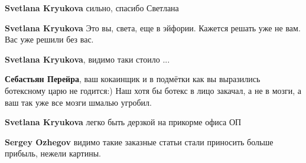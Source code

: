 \begin{itemize}
\begin{itemize}
 
\textbf{Svetlana Kryukova} сильно, спасибо Светлана

 
\textbf{Svetlana Kryukova} Это вы, света, еще
в эйфории. Кажется решать уже не вам. Вас уже решили без вас.

 
\textbf{Svetlana Kryukova}, видимо таки стоило ...

 
\textbf{Себастьян Перейра}, ваш кокаинщик и в подмётки как вы выразились
ботексному царю не годится:) Наш хотя бы ботекс в лицо закачал, а не в мозги, а
ваш так уже все мозги шмалью угробил.\Smiley[1.0][yellow]


 
\textbf{Svetlana Kryukova} легко быть дерзкой на прикорме офиса ОП

 
\textbf{Sergey Ozhegov} видимо такие заказные статьи стали приносить больше прибыль, нежели картины.

 

\end{itemize}
\end{itemize}
